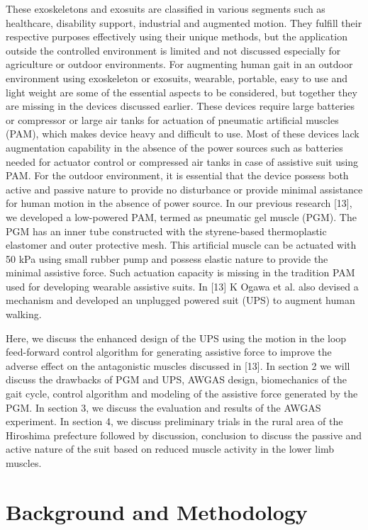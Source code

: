 \documentclass[paper,JRM,paper]{jaciiiarticle}
\begin{document}
These exoskeletons and exosuits are classified in various segments such as healthcare, disability support, industrial and augmented motion. They fulfill their respective purposes effectively using their unique methods, but the application outside the controlled environment is limited and not discussed especially for agriculture or outdoor environments. For augmenting human gait in an outdoor environment using exoskeleton or exosuits, wearable, portable, easy to use and light weight are some of the essential aspects to be considered, but together they are missing in the devices discussed earlier. These devices require large batteries or compressor or large air tanks for actuation of pneumatic artificial muscles (PAM), which makes device heavy and difficult to use. Most of these devices lack augmentation capability in the absence of the power sources such as batteries needed for actuator control or compressed air tanks in case of assistive suit using PAM. For the outdoor environment, it is essential that the device possess both active and passive nature to provide no disturbance or provide minimal assistance for human motion in the absence of power source. In our previous research [13], we developed a low-powered PAM, termed as pneumatic gel muscle (PGM). The PGM has an inner tube constructed with the styrene-based thermoplastic elastomer and outer protective mesh. This artificial muscle can be actuated with 50 kPa using small rubber pump and possess elastic nature to provide the minimal assistive force. Such actuation capacity is missing in the tradition PAM used for developing wearable assistive suits. In [13] K Ogawa et al. also devised a mechanism and developed an unplugged powered suit (UPS) to augment human walking.

Here, we discuss the enhanced design of the UPS using the motion in the loop feed-forward control algorithm for generating assistive force to improve the adverse effect on the antagonistic muscles discussed in [13]. In section 2 we will discuss the drawbacks of PGM and UPS, AWGAS design, biomechanics of the gait cycle, control algorithm and modeling of the assistive force generated by the PGM. In section 3, we discuss the evaluation and results of the AWGAS experiment. In section 4, we discuss preliminary trials in the rural area of the Hiroshima prefecture followed by discussion, conclusion to discuss the passive and active nature of the suit based on reduced muscle activity in the lower limb muscles.




\section{Background and Methodology}
\end{document}
